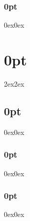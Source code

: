 \documentclass[11pt]{report}
\begin{document}
\begin{flushleft}
    \LARGE{\yourThesisTitle}
\end{flushleft}
\subsectionfont{\fontsize{13}{16}\normalfont}
\titlespacing\subsection{0pt}{0ex}{0ex}
\subsection*{\yourNameInclTitle}
\vspace{-0.5em}
\noindent{\textit{\universityCityCountry}}
\vspace{1em}

\titleformat{\chapter}{\normalfont\large}{\thechapter}{20pt}{\normalfont\large\MakeUppercase}
\chapterfont{\fontsize{13}{16}\normalfont\MakeUppercase}
\titlespacing\chapter{0pt}{2ex}{2ex}
\sectionfont{\fontsize{13}{16}\normalfont}
\titlespacing\section{0pt}{0ex}{0ex}
\subsectionfont{\fontsize{13}{16}\normalfont}
\titlespacing\subsection{0pt}{0ex}{0ex}
\subsubsectionfont{\fontsize{13}{16}\normalfont}
\titlespacing\subsection{0pt}{0ex}{0ex}
\setcounter{secnumdepth}{5}

\makeatletter
\patchcmd{\chapter}{\clearpage}{}{}{}
\makeatother








\clearpage
\end{document}
